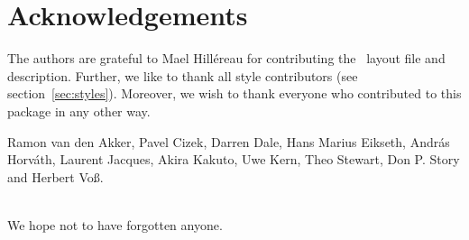 \section*{Acknowledgements}

The authors are grateful to Mael Hill\'ereau for contributing the
\LyX\ layout file and description. Further, we like to thank all
style contributors (see section~\ref{sec:styles}). Moreover, we wish
to thank everyone who contributed to this package in any other
way.\\[1em]
\begin{minipage}{.9\linewidth}
Ramon van den Akker, Pavel Cizek, Darren Dale, Hans Marius Eikseth,
Andr\'as Horv\'ath, Laurent Jacques, Akira Kakuto, Uwe Kern, Theo
Stewart, Don P. Story and Herbert Vo\ss.
\end{minipage}
\\[1em]
We hope not to have forgotten anyone.

\endinput
